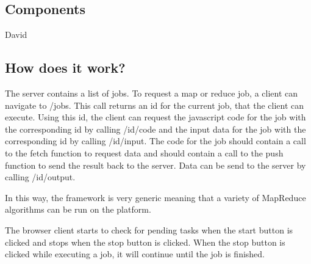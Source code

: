 	\subsection{Components}
	David
	\subsection{How does it work?}
		The server contains a list of jobs. To request a map or reduce job, a client can navigate to /jobs. 
		This call returns an id for the current job, that the client can execute. Using this id, 
		the client can request the javascript code for the job with the corresponding id by calling /{id}/code
		and the input data for the job with the corresponding id by calling /{id}/input.
		The code for the job should contain a call to the fetch function to request data and should contain a call to the push
		function to send the result back to the server.
		Data can be send to the server by calling /{id}/output.
		
		In this way, the framework is very generic meaning that a variety of MapReduce algorithms can be run on the platform.
		
		The browser client starts to check for pending tasks when the start button is clicked and stops when the stop button is clicked.
		When the stop button is clicked while executing a job, it will continue until the job is finished.